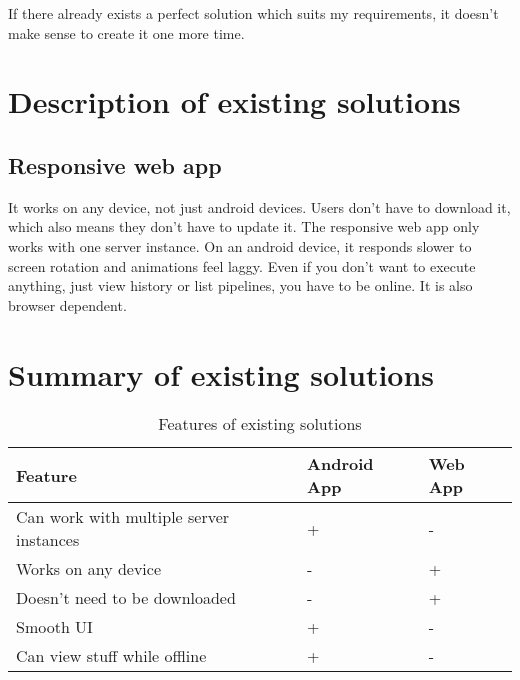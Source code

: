 If there already exists a perfect solution which suits my requirements, it doesn't make sense to create it one more time.

\section{Description of existing solutions}

\subsection{Responsive web app}
It works on any device, not just android devices.
Users don't have to download it, which also means they don't have to update it.
The responsive web app only works with one server instance.
On an android device, it responds slower to screen rotation and animations feel laggy.
Even if you don't want to execute anything, just view history or list pipelines, you have to be online.
It is also browser dependent.

\section{Summary of existing solutions}

\begin{table}[h]\centering
\caption[Existing solutions]{Features of existing solutions}\label{tab:existingSolutionsTable}
\begin{tabular}{l|l|l}
\hline
Feature & Android App & Web App \\ \hline
Can work with multiple server instances & + & - \\ \hline
Works on any device & - & + \\ \hline
Doesn't need to be downloaded & - & + \\ \hline
Smooth UI & + & - \\ \hline
Can view stuff while offline & + & - \\ \hline
\end{tabular}
\end{table}